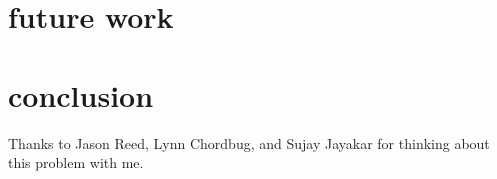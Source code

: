 \documentclass[11pt]{sigplanconf}
\begin{document}

\section{future work}




\section{conclusion}



\acks

Thanks to Jason Reed, Lynn Chordbug, and Sujay Jayakar for thinking about this problem with me.


\renewcommand{\refname}{references}


\end{document}
